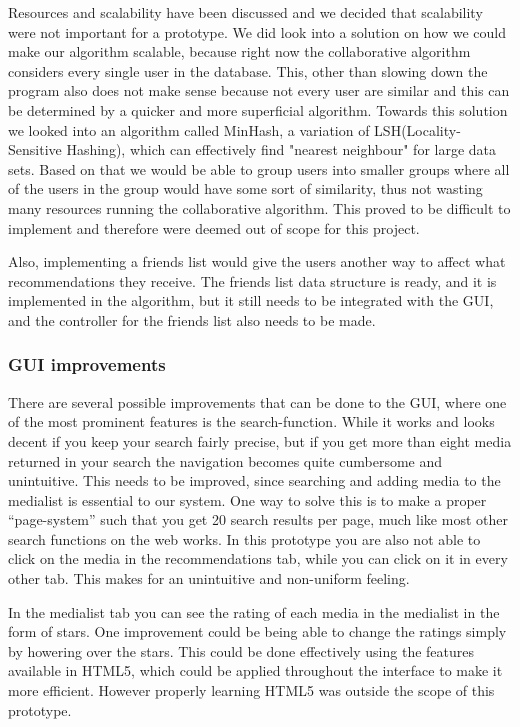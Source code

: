 Resources and scalability have been discussed and we decided that scalability were not important for a prototype. We did look into a solution on how we could make our algorithm scalable, because right now the collaborative algorithm considers every single user in the database. This, other than slowing down the program also does not make sense because not every user are similar and this can be determined by a quicker and more superficial algorithm. Towards this solution we looked into an algorithm called MinHash, a variation of LSH(Locality-Sensitive Hashing), which can effectively find "nearest neighbour" for large data sets. Based on that we would be able to group users into smaller groups where all of the users in the group would have some sort of similarity, thus not wasting many resources running the collaborative algorithm. This proved to be difficult to implement and therefore were deemed out of scope for this project.

Also, implementing a friends list would give the users another way to affect what recommendations they receive. The friends list data structure is ready, and it is implemented in the algorithm, but it still needs to be integrated with the GUI, and the controller for the friends list also needs to be made.

\subsubsection{GUI improvements}
There are several possible improvements that can be done to the GUI, where one of the most prominent features is the search-function. While it works and looks decent if you keep your search fairly precise, but if you get more than eight media returned in your search the navigation becomes quite cumbersome and unintuitive. This needs to be improved, since searching and adding media to the medialist is essential to our system. One way to solve this is to make a proper “page-system” such that you get 20 search results per page, much like most other search functions on the web works.
In this prototype you are also not able to click on the media in the recommendations tab, while you can click on it in every other tab. This makes for an unintuitive and non-uniform feeling.

In the medialist tab you can see the rating of each media in the medialist in the form of stars. One improvement could be being able to change the ratings simply by howering over the stars. This could be done effectively using the features available in HTML5, which could be applied throughout the interface to make it more efficient. However properly learning HTML5 was outside the scope of this prototype.

